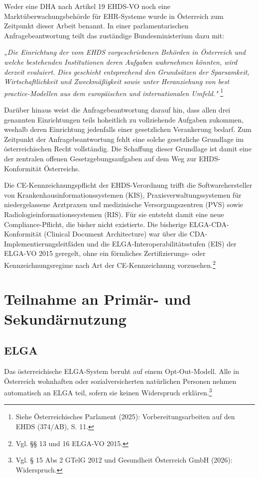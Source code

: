 Weder eine DHA nach Artikel 19 EHDS-VO noch eine Marktüberwachungsbehörde für EHR-Systeme wurde in Österreich zum Zeitpunkt dieser Arbeit benannt. In einer parlamentarischen Anfragebeantwortung teilt das zuständige Bundesministerium dazu mit:

\textit{„Die Einrichtung der vom EHDS vorgeschriebenen Behörden in Österreich und welche bestehenden Institutionen deren Aufgaben wahrnehmen könnten, wird derzeit evaluiert. Dies geschieht entsprechend den Grundsätzen der Sparsamkeit, Wirtschaftlichkeit und Zweckmäßigkeit sowie unter Heranziehung von best practice-Modellen aus dem europäischen und internationalen Umfeld."}
\footnote{Siehe Österreichisches Parlament (2025): Vorbereitungsarbeiten auf den EHDS (374/AB), S. 11.}

Darüber hinaus weist die Anfragebeantwortung darauf hin, dass allen drei genannten Einrichtungen teils hoheitlich zu vollziehende Aufgaben zukommen, weshalb deren Einrichtung jedenfalls einer gesetzlichen Verankerung bedarf. Zum Zeitpunkt der Anfragebeantwortung fehlt eine solche gesetzliche Grundlage im österreichischen Recht vollständig. Die Schaffung dieser Grundlage ist damit eine der zentralen offenen Gesetzgebungsaufgaben auf dem Weg zur EHDS-Konformität Österreichs.

Die CE-Kennzeichnungspflicht der EHDS-Verordnung trifft die Softwarehersteller von Krankenhausinformationssystemen (KIS), Praxisverwaltungssystemen für niedergelassene Arztpraxen und medizinische Versorgungszentren (PVS) sowie Radiologieinformationssystemen (RIS). Für sie entsteht damit eine neue Compliance-Pflicht, die bisher nicht existierte. Die bisherige ELGA-CDA-Konformität (Clinical Document Architecture) war über die CDA-Implementierungsleitfäden und die ELGA-Interoperabilitätsstufen (EIS) der ELGA-VO 2015 geregelt, ohne ein förmliches Zertifizierungs- oder Kennzeichnungsregime nach Art der CE-Kennzeichnung vorzusehen.\footnote{Vgl. §§ 13 und 16 ELGA-VO 2015.}

\section{Teilnahme an Primär- und Sekundärnutzung}

\subsection{ELGA}
Das österreichische ELGA-System beruht auf einem Opt-Out-Modell. Alle in Österreich wohnhaften oder sozialversicherten natürlichen Personen nehmen automatisch an ELGA teil, sofern sie keinen Widerspruch erklären.\footnote{Vgl. § 15 Abs 2 GTelG 2012 und Gesundheit Österreich GmbH (2026): Widerspruch.}


